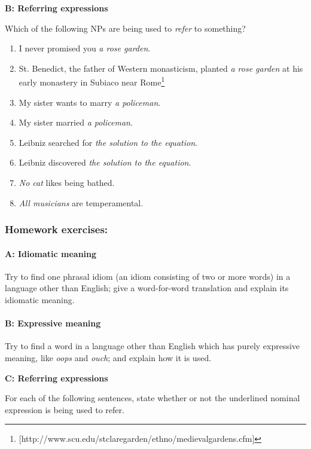 \textbf{B: Referring expressions}

Which of the following NPs are being used to \textit{refer} to something?

\begin{enumerate}[label=\alph*.]
\item I never promised you \textit{a rose garden}.
\item St. Benedict, the father of Western monasticism, planted \textit{a rose garden} at his early monastery in Subiaco near Rome\footnote{[http://www.scu.edu/stclaregarden/ethno/medievalgardens.cfm]}
\item My sister wants to marry \textit{a policeman}.
\item My sister married \textit{a policeman}.
\item Leibniz searched for \textit{the solution to the equation}.
\item Leibniz discovered \textit{the solution to the equation}.
\item \textit{No cat} likes being bathed.
\item \textit{All musicians} are temperamental.
\end{enumerate}

\subsubsection{Homework exercises:}\label{sec:}
\paragraph{A: Idiomatic meaning}

Try to find one phrasal idiom (an idiom consisting of two or more words) in a language other than English; give a word-for-word translation and explain its idiomatic meaning.

\paragraph{B: Expressive meaning}

Try to find a word in a language other than English which has purely expressive meaning, like \textit{oops} and \textit{ouch}; and explain how it is used.

\textbf{C: Referring expressions}

For each of the following sentences, state whether or not the underlined nominal expression is being used to refer.

